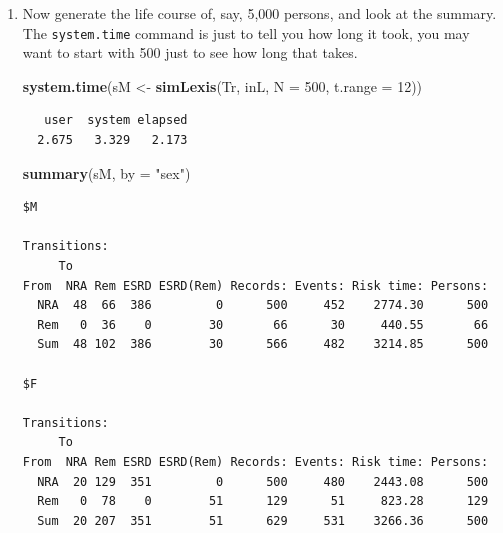 \documentclass[
]{book}
\newenvironment{Shaded}{\begin{snugshade}}{\end{snugshade}}
\newcommand{\AttributeTok}[1]{\textcolor[rgb]{0.13,0.29,0.53}{#1}}
\newcommand{\DecValTok}[1]{\textcolor[rgb]{0.00,0.00,0.81}{#1}}
\newcommand{\FunctionTok}[1]{\textcolor[rgb]{0.13,0.29,0.53}{\textbf{#1}}}
\newcommand{\NormalTok}[1]{#1}
\newcommand{\OtherTok}[1]{\textcolor[rgb]{0.56,0.35,0.01}{#1}}
\newcommand{\StringTok}[1]{\textcolor[rgb]{0.31,0.60,0.02}{#1}}
\begin{document}
\begin{enumerate}
\begin{verbatim}
$F

Transitions:
     To
From  NRA Rem ESRD ESRD(Rem) Records: Events: Risk time: Persons:
  NRA   0   4    6         0       10      10      37.75       10
  Rem   0   1    0         3        4       3      37.25        4
  Sum   0   5    6         3       14      13      75.00       10
\end{verbatim}

  What type of object have you got as \texttt{iL}?
\item
  Now generate the life course of, say, 5,000 persons, and look at the summary.
  The \texttt{system.time} command is just to tell you how long it
  took, you may want to start with 500 just to see how long that takes.

\begin{Shaded}
\begin{Highlighting}[]
\FunctionTok{system.time}\NormalTok{(sM }\OtherTok{\textless{}{-}} \FunctionTok{simLexis}\NormalTok{(Tr, inL, }\AttributeTok{N =} \DecValTok{500}\NormalTok{, }\AttributeTok{t.range =} \DecValTok{12}\NormalTok{))}
\end{Highlighting}
\end{Shaded}

\begin{verbatim}
   user  system elapsed 
  2.675   3.329   2.173 
\end{verbatim}

\begin{Shaded}
\begin{Highlighting}[]
\FunctionTok{summary}\NormalTok{(sM, }\AttributeTok{by =} \StringTok{"sex"}\NormalTok{)}
\end{Highlighting}
\end{Shaded}

\begin{verbatim}
$M

Transitions:
     To
From  NRA Rem ESRD ESRD(Rem) Records: Events: Risk time: Persons:
  NRA  48  66  386         0      500     452    2774.30      500
  Rem   0  36    0        30       66      30     440.55       66
  Sum  48 102  386        30      566     482    3214.85      500

$F

Transitions:
     To
From  NRA Rem ESRD ESRD(Rem) Records: Events: Risk time: Persons:
  NRA  20 129  351         0      500     480    2443.08      500
  Rem   0  78    0        51      129      51     823.28      129
  Sum  20 207  351        51      629     531    3266.36      500
\end{verbatim}


\end{enumerate}
\end{document}

